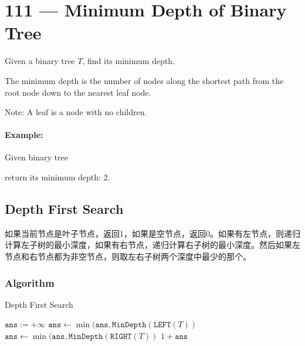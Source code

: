 \section{111 --- Minimum Depth of Binary Tree}
Given a binary tree $T$, find its minimum depth.
\par
The minimum depth is the number of nodes along the shortest path from the root node down to the nearest leaf node.
\par
Note: A leaf is a node with no children.
\paragraph{Example:}
\begin{flushleft}
Given binary tree
\begin{figure}[H]
\end{figure}
return its minimum depth: 2.
\end{flushleft}
\subsection{Depth First Search}
\begin{CJK*}{UTF8}{gbsn}
如果当前节点是叶子节点，返回1，如果是空节点，返回0。如果有左节点，则递归计算左子树的最小深度，如果有右节点，递归计算右子树的最小深度。然后如果左节点和右节点都为非空节点，则取左右子树两个深度中最少的那个。
\end{CJK*}
\subsubsection{Algorithm}
\setcounter{algorithm}{0}
\begin{algorithm}[H]
\caption{Depth First Search}
\begin{algorithmic}[1]
\State {}
\EndIf
{}
\State {}
\EndIf
\State $\texttt{ans}:=+\infty$
\State $\texttt{ans}\gets \min(\texttt{ans}, \texttt{MinDepth}(\texttt{LEFT}(T))$
\EndIf
{}
\State $\texttt{ans}\gets \min(\texttt{ans}, \texttt{MinDepth}(\texttt{RIGHT}(T))$
\EndIf
\State \Return $1+\texttt{ans}$
\EndProcedure
\end{algorithmic}
\end{algorithm}
